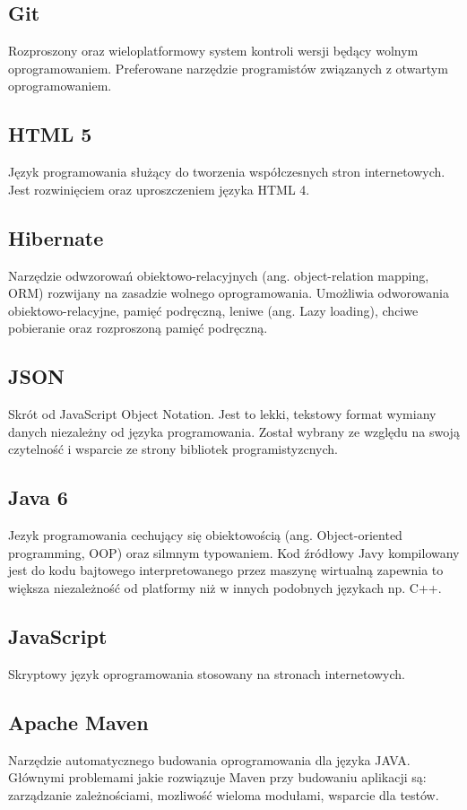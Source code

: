 \documentclass[11pt,a4paper,polish,thesis]{dcsbook}
\begin{document}
\subsection{Git}
Rozproszony oraz wieloplatformowy system kontroli wersji będący wolnym oprogramowaniem. Preferowane narzędzie programistów związanych z otwartym oprogramowaniem.
\subsection{HTML 5}
Język programowania służący do tworzenia współczesnych stron internetowych. Jest rozwinięciem oraz uproszczeniem języka HTML 4.
\subsection{Hibernate}
Narzędzie odwzorowań obiektowo-relacyjnych (ang. object-relation mapping, ORM) rozwijany na zasadzie wolnego oprogramowania. Umożliwia odworowania obiektowo-relacyjne, pamięć podręczną, leniwe (ang. Lazy loading), chciwe pobieranie oraz rozproszoną pamięć podręczną.
\subsection{JSON}
Skrót od JavaScript Object Notation. Jest to lekki, tekstowy format wymiany danych niezależny od języka programowania. Został wybrany ze względu na swoją czytelność i wsparcie ze strony bibliotek programistyzcnych.
\subsection{Java 6}
Jezyk programowania cechujący się obiektowością (ang. Object-oriented programming, OOP) oraz silmnym typowaniem. Kod źródłowy Javy kompilowany jest do kodu bajtowego interpretowanego przez maszynę wirtualną zapewnia to większa niezależność od platformy niż w innych podobnych językach np. C++.
\subsection{JavaScript}
Skryptowy język oprogramowania stosowany na stronach internetowych.
\subsection{Apache Maven}
Narzędzie automatycznego budowania oprogramowania dla języka JAVA. Głównymi problemami jakie rozwiązuje Maven przy budowaniu aplikacji są: zarządzanie zależnościami, mozliwość wieloma modułami, wsparcie dla testów.
\end{document}
